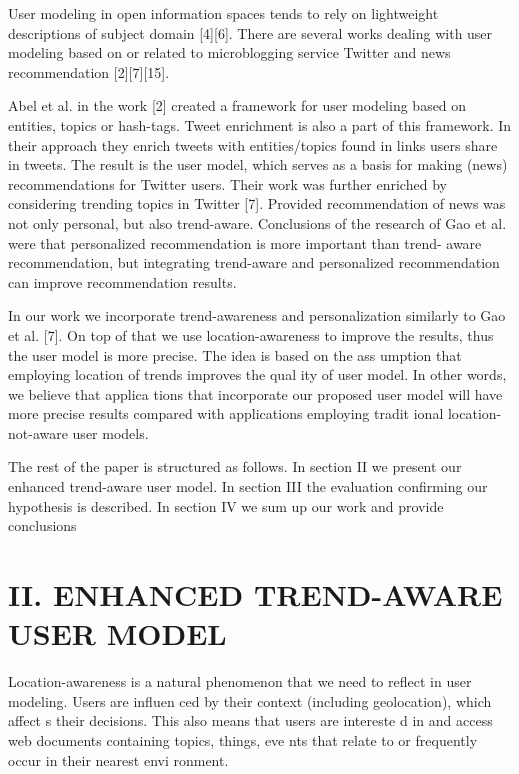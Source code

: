 \documentclass[conference]{IEEEtran}
\begin{document}
User  modeling  in  open  information  spaces  tends  to  rely 
on  lightweight  descriptions  of  subject  domain  [4][6].  There 
are  several  works  dealing  with  user  modeling  based on  or 
related    to    microblogging    service    Twitter    and    news recommendation [2][7][15]. 

Abel  et  al.  in  the  work  [2]  created  a  framework  for  user 
modeling   based   on   entities,   topics   or   hash-tags.   Tweet 
enrichment is also a part of this framework. In their approach 
they  enrich  tweets  with  entities/topics  found  in  links  users 
share in tweets. The result is the user model, which serves as 
a  basis  for  making  (news)  recommendations  for  Twitter 
users.   Their   work   was   further   enriched   by   considering 
trending  topics in Twitter [7].   Provided recommendation  of 
news    was    not    only    personal,    but    also    trend-aware. Conclusions   of   the   research   of   Gao   et   al.   were   that
personalized  recommendation  is  more  important  than trend-
aware   recommendation,   but   integrating   trend-aware   and 
personalized  recommendation  can  improve  recommendation results.  

In   our    work    we    incorporate    trend-awareness    and personalization similarly to Gao et al. [7]. On top
 of that we use  location-awareness  to  improve  the  results,  thus
  the  user model  is  more  precise.  The  idea  is  based  on  the  ass
umption that  employing  location  of  trends  improves  the  qual
ity  of user model. In other words, we believe that applica
tions that incorporate our proposed  user  model  will  have  more 
precise results  compared  with  applications  employing  tradit
ional location-not-aware user models. 

The rest of the paper is structured as follows. In section II 
we  present our  enhanced trend-aware  user  model.  In section 
III the evaluation  confirming  our  hypothesis  is  described. In 
section IV we sum up our work and provide conclusions
\section*{II.   ENHANCED TREND-AWARE USER MODEL}
Location-awareness  is  a  natural  phenomenon  that  we 
need  to  reflect  in  user  modeling.  Users  are  influen
ced  by 
their  context  (including  geolocation),  which  affect
s  their 
decisions.  This  also  means  that  users  are  intereste
d  in  and 
access  web  documents  containing  topics,  things,  eve
nts  that 
relate to or frequently occur in their nearest envi
ronment. 
\end{document}
